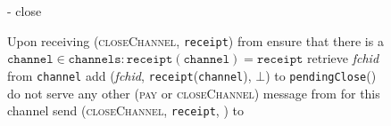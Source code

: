   \begin{figure}[H]
    \begin{systembox}{\fpaynet{} - close}
      \begin{algorithmic}[1]
        \State Upon receiving (\textsc{closeChannel}, \texttt{receipt}) from
        \alice
        \Indent
          \State ensure that there is a $\mathtt{channel} \in \mathtt{channels}
          : \mathtt{receipt}\left(\mathtt{channel}\right) = \mathtt{receipt}$
          \State retrieve \textit{fchid} from \texttt{channel}
          \label{alg:fpaynet:close:retrieve}
          \State add (\textit{fchid}, \texttt{receipt}(\texttt{channel}),
          $\bot$) to \texttt{pendingClose}(\alice)
          \label{alg:fpaynet:close:mark}
          \State do not serve any other (\textsc{pay} or \textsc{closeChannel})
          message from \alice{} for this channel
          \label{alg:fpaynet:close:noserve}
          \State send (\textsc{closeChannel}, \texttt{receipt}, \alice) to
          \simulator
          \label{alg:fpaynet:close:send}
        \EndIndent
        \Statex


\end{algorithmic}
\end{systembox}
\end{figure}
